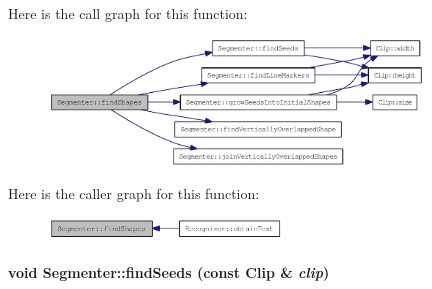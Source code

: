 Here is the call graph for this function:\nopagebreak
\begin{figure}[H]
\begin{center}
\leavevmode
\includegraphics[width=282pt]{class_segmenter_465c8e755bb56d247add080a04377520_cgraph}
\end{center}
\end{figure}


Here is the caller graph for this function:\nopagebreak
\begin{figure}[H]
\begin{center}
\leavevmode
\includegraphics[width=176pt]{class_segmenter_465c8e755bb56d247add080a04377520_icgraph}
\end{center}
\end{figure}
\hypertarget{class_segmenter_bacab187b543a51c5322c01fc0a29ffb}{
\paragraph[findSeeds]{\setlength{\rightskip}{0pt plus 5cm}void Segmenter::findSeeds (const {\bf Clip} \& {\em clip})}\hfill}
\label{class_segmenter_bacab187b543a51c5322c01fc0a29ffb}


